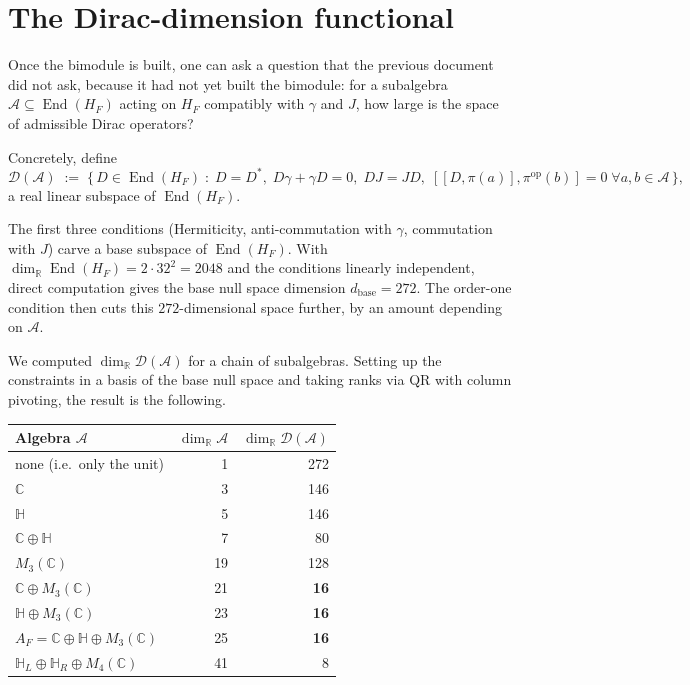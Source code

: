 \documentclass[11pt,a4paper]{article}
\begin{document}
\section{The Dirac-dimension functional}\label{sec:diracdim}

Once the bimodule is built, one can ask a question that the previous document
did not ask, because it had not yet built the bimodule: for a subalgebra
$\mathcal{A} \subseteq \operatorname{End}(H_F)$ acting on $H_F$ compatibly with
$\gamma$ and $J$, how large is the space of admissible Dirac operators?

Concretely, define
\[
  \mathcal{D}(\mathcal{A}) \;:=\; \Big\{\, D \in \operatorname{End}(H_F)
  \;:\;
  D = D^*,\;
  D\gamma + \gamma D = 0,\;
  DJ = JD,\;
  [[D, \pi(a)], \pi^{\mathrm{op}}(b)] = 0\;\forall a, b \in \mathcal{A}
  \,\Big\},
\]
a real linear subspace of $\operatorname{End}(H_F)$.

The first three conditions (Hermiticity, anti-commutation with $\gamma$,
commutation with $J$) carve a base subspace of $\operatorname{End}(H_F)$. With
$\dim_{\mathbb{R}} \operatorname{End}(H_F) = 2 \cdot 32^2 = 2048$ and the
conditions linearly independent, direct computation gives the base null space
dimension $d_{\mathrm{base}} = 272$. The order-one condition then cuts this
$272$-dimensional space further, by an amount depending on $\mathcal{A}$.

We computed $\dim_{\mathbb{R}} \mathcal{D}(\mathcal{A})$ for a chain of
subalgebras. Setting up the constraints in a basis of the base null space and
taking ranks via QR with column pivoting, the result is the following.

\begin{center}
\renewcommand{\arraystretch}{1.05}
\begin{tabular}{lrr}
\toprule
Algebra $\mathcal{A}$ & $\dim_{\mathbb{R}} \mathcal{A}$ &
$\dim_{\mathbb{R}} \mathcal{D}(\mathcal{A})$ \\
\midrule
none (i.e.\ only the unit) & 1 & 272 \\
$\mathbb{C}$ & 3 & 146 \\
$\mathbb{H}$ & 5 & 146 \\
$\mathbb{C} \oplus \mathbb{H}$ & 7 & 80 \\
$M_3(\mathbb{C})$ & 19 & 128 \\
$\mathbb{C} \oplus M_3(\mathbb{C})$ & 21 & \textbf{16} \\
$\mathbb{H} \oplus M_3(\mathbb{C})$ & 23 & \textbf{16} \\
$A_F = \mathbb{C} \oplus \mathbb{H} \oplus M_3(\mathbb{C})$ & 25 & \textbf{16} \\
$\mathbb{H}_L \oplus \mathbb{H}_R \oplus M_4(\mathbb{C})$ & 41 & 8 \\
\bottomrule
\end{tabular}
\end{center}
\end{document}
